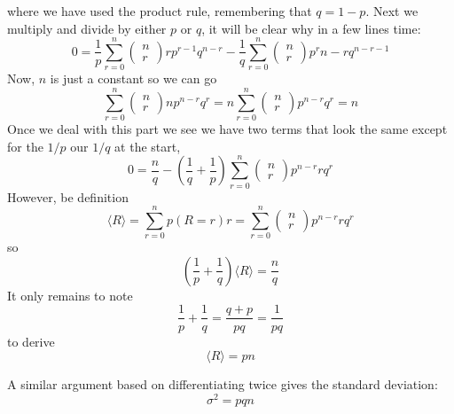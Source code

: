 \documentclass[11pt,a4paper]{scrartcl}
\begin{document}
where we have used the product rule, remembering that $q=1-p$. Next we multiply and divide by either $p$ or $q$, it will be clear why in a few lines time:
\begin{equation}
0=\frac{1}{p}\sum_{r=0}^n \left(\begin{array}{c}n\\r\end{array}\right)rp^{r-1}q^{n-r}
-\frac{1}{q}\sum_{r=0}^n \left(\begin{array}{c}n\\r\end{array}\right)p^r{n-r}q^{n-r-1}
\end{equation}
Now, $n$ is just a constant so we can go
\begin{equation}
\sum_{r=0}^n \left(\begin{array}{c}n\\r\end{array}\right)np^{n-r}q^r=n\sum_{r=0}^n \left(\begin{array}{c}n\\r\end{array}\right)p^{n-r}q^r=n
\end{equation}
Once we deal with this part we see we have two terms that look the same except for the $1/p$ our $1/q$ at the start, 
\begin{equation}
0=\frac{n}{q}-\left(\frac{1}{q}+\frac{1}{p}\right)\sum_{r=0}^n \left(\begin{array}{c}n\\r\end{array}\right)p^{n-r}rq^r
\end{equation}
However, be definition
\begin{equation}
\langle R\rangle=\sum_{r=0}^n p(R=r)r=\sum_{r=0}^n \left(\begin{array}{c}n\\r\end{array}\right)p^{n-r}rq^r
\end{equation}
so
\begin{equation}
\left(\frac{1}{p}+\frac{1}{q}\right)\langle R\rangle=\frac{n}{q}
\end{equation}
It only remains to note
\begin{equation}
\frac{1}{p}+\frac{1}{q}=\frac{q+p}{pq}=\frac{1}{pq}
\end{equation}
to derive
\begin{equation}
\langle R\rangle=pn
\end{equation}

A similar argument based on differentiating twice gives the standard
deviation:
\begin{equation}
\sigma^2=pqn
\end{equation}
\end{document}

